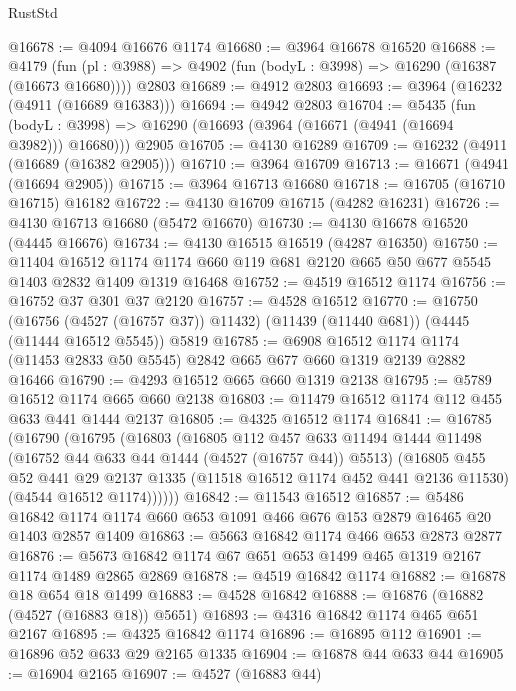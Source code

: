 \begin{lexlean}{RustStd}
\begin{coremodule}
{\begin{coremodule}
{{{{{{{{{{{{{{{{{{{{{{{{{{{{{{{{{{{{{{@16678 := @4094 @16676 @1174
@16680 := @3964 @16678 @16520
@16688 := @4179
    (fun (pl : @3988) => @4902 (fun (bodyL : @3998) => @16290 (@16387 (@16673 @16680))))
    @2803
@16689 := @4912 @2803
@16693 := @3964 (@16232 (@4911 (@16689 @16383)))
@16694 := @4942 @2803
@16704 := @5435
    (fun (bodyL : @3998) => @16290 (@16693 (@3964 (@16671 (@4941 (@16694 @3982))) @16680)))
    @2905
@16705 := @4130 @16289
@16709 := @16232 (@4911 (@16689 (@16382 @2905)))
@16710 := @3964 @16709
@16713 := @16671 (@4941 (@16694 @2905))
@16715 := @3964 @16713 @16680
@16718 := @16705 (@16710 @16715) @16182
@16722 := @4130 @16709 @16715 (@4282 @16231)
@16726 := @4130 @16713 @16680 (@5472 @16670)
@16730 := @4130 @16678 @16520 (@4445 @16676)
@16734 := @4130 @16515 @16519 (@4287 @16350)
@16750 := @11404
    @16512
    @1174
    @1174
    @660
    @119
    @681
    @2120
    @665
    @50
    @677
    @5545
    @1403
    @2832
    @1409
    @1319
    @16468
@16752 := @4519 @16512 @1174
@16756 := @16752 @37 @301 @37 @2120
@16757 := @4528 @16512
@16770 := @16750
    (@16756 (@4527 (@16757 @37)) @11432)
    (@11439 (@11440 @681))
    (@4445 (@11444 @16512 @5545))
    @5819
@16785 := @6908
    @16512
    @1174
    @1174
    (@11453 @2833 @50 @5545)
    @2842
    @665
    @677
    @660
    @1319
    @2139
    @2882
    @16466
@16790 := @4293 @16512 @665 @660 @1319 @2138
@16795 := @5789 @16512 @1174 @665 @660 @2138
@16803 := @11479 @16512 @1174 @112 @455 @633 @441 @1444 @2137
@16805 := @4325 @16512 @1174
@16841 := @16785
    (@16790
      (@16795
        (@16803
          (@16805
            @112
            @457
            @633
            @11494
            @1444
            @11498
            (@16752 @44 @633 @44 @1444 (@4527 (@16757 @44)) @5513)
            (@16805
              @455
              @52
              @441
              @29
              @2137
              @1335
              (@11518 @16512 @1174 @452 @441 @2136 @11530)
              (@4544 @16512 @1174))))))
@16842 := @11543 @16512
@16857 := @5486 @16842 @1174 @1174 @660 @653 @1091 @466 @676 @153 @2879 @16465 @20 @1403 @2857 @1409
@16863 := @5663 @16842 @1174 @466 @653 @2873 @2877
@16876 := @5673 @16842 @1174 @67 @651 @653 @1499 @465 @1319 @2167 @1174 @1489 @2865 @2869
@16878 := @4519 @16842 @1174
@16882 := @16878 @18 @654 @18 @1499
@16883 := @4528 @16842
@16888 := @16876 (@16882 (@4527 (@16883 @18)) @5651)
@16893 := @4316 @16842 @1174 @465 @651 @2167
@16895 := @4325 @16842 @1174
@16896 := @16895 @112
@16901 := @16896 @52 @633 @29 @2165 @1335
@16904 := @16878 @44 @633 @44
@16905 := @16904 @2165
@16907 := @4527 (@16883 @44)
}}}}}}}}}}}}}}}}}}}}}}}}}}}}}}}}}}}}}}
\end{coremodule}}
\end{coremodule}
\end{lexlean}
